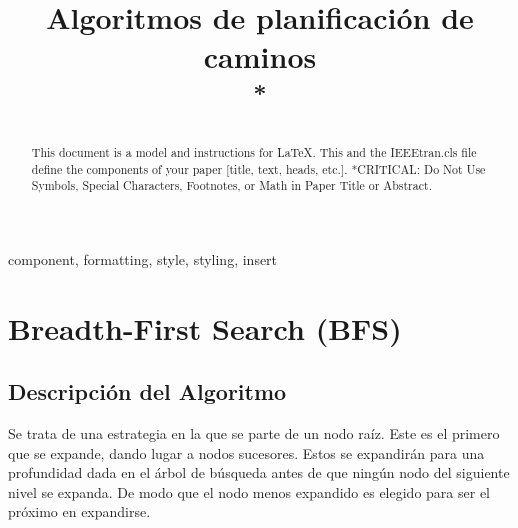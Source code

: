 \documentclass[conference]{IEEEtran}
\begin{document}
\title{Algoritmos de planificación de caminos\\
{\footnotesize \textsuperscript{*}}
}

\author{
\and
{}
\and
{}
}

\maketitle

\begin{abstract}
This document is a model and instructions for \LaTeX.
This and the IEEEtran.cls file define the components of your paper [title, text, heads, etc.]. *CRITICAL: Do Not Use Symbols, Special Characters, Footnotes, 
or Math in Paper Title or Abstract.
\end{abstract}

\begin{IEEEkeywords}
component, formatting, style, styling, insert
\end{IEEEkeywords}


\section{Breadth-First Search (BFS)}

\vspace{0.2mm}

\subsection{Descripción del Algoritmo}

Se trata de una estrategia en la que se parte de un nodo ra\'iz. Este es el primero que se expande, dando lugar a nodos sucesores. Estos se expandir\'an para una profundidad dada en el \'arbol de b\'usqueda antes de que ningún nodo del siguiente nivel se expanda. De modo que el nodo menos expandido es elegido para ser el pr\'oximo en expandirse.
\end{document}
